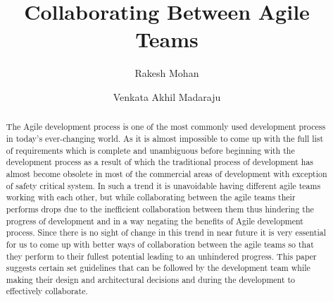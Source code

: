 \documentclass[sigconf]{acmart}
\begin{document}
%
\title{Collaborating Between Agile Teams}

%
\author{Rakesh Mohan}
\author{Venkata Akhil Madaraju}

%
\begin{abstract}
The Agile development process is one of the most commonly used development process in today's ever-changing world. As it is almost impossible to come up with the full list of requirements which is complete and unambiguous before beginning with the development process as a result of which the traditional process of development has almost become obsolete in most of the commercial areas of development with exception of safety critical system. In such a trend it is unavoidable having different agile teams working with each other, but while collaborating between the agile teams their performs drops due to the inefficient collaboration between them thus hindering the progress of development and in a way negating the benefits of Agile development process. Since there is no sight of change in this trend in near future it is very essential for us to come up with better ways of collaboration between the agile teams so that they perform to their fullest potential leading to an unhindered progress. This paper suggests certain set guidelines that can be followed by the development team while making their design and architectural decisions and during the development to effectively collaborate.
\end{abstract}


%

%


%
\maketitle
\end{document}
